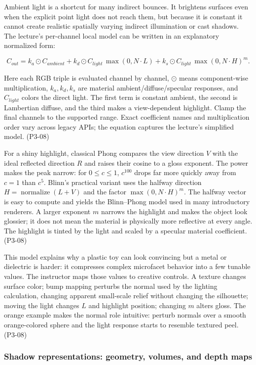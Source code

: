 Ambient light is a shortcut for many indirect bounces. It brightens surfaces even when the explicit point light does not reach them, but because it is constant it cannot create realistic spatially varying indirect illumination or cast shadows. The lecture's per-channel local model can be written in an explanatory normalized form:

\[
C_{out}=k_a\odot C_{ambient}+k_d\odot C_{light}\,\max(0,N\cdot L)+k_s\odot C_{light}\,\max(0,N\cdot H)^m.
\]

Here each RGB triple is evaluated channel by channel, \(\odot\) means component-wise multiplication, \(k_a,k_d,k_s\) are material ambient/diffuse/specular responses, and \(C_{light}\) colors the direct light. The first term is constant ambient, the second is Lambertian diffuse, and the third makes a view-dependent highlight. Clamp the final channels to the supported range. Exact coefficient names and multiplication order vary across legacy APIs; the equation captures the lecture's simplified model. (P3-08)

For a shiny highlight, classical Phong compares the view direction \(V\) with the ideal reflected direction \(R\) and raises their cosine to a gloss exponent. The power makes the peak narrow: for \(0\le c\le1\), \(c^{100}\) drops far more quickly away from \(c=1\) than \(c^5\). Blinn's practical variant uses the halfway direction \(H=\operatorname{normalize}(L+V)\) and the factor \(\max(0,N\cdot H)^m\). The halfway vector is easy to compute and yields the Blinn--Phong model used in many introductory renderers. A larger exponent \(m\) narrows the highlight and makes the object look glossier; it does not mean the material is physically more reflective at every angle. The highlight is tinted by the light and scaled by a specular material coefficient. (P3-08)

This model explains why a plastic toy can look convincing but a metal or dielectric is harder: it compresses complex microfacet behavior into a few tunable values. The instructor maps those values to creative controls. A texture changes surface color; bump mapping perturbs the normal used by the lighting calculation, changing apparent small-scale relief without changing the silhouette; moving the light changes \(L\) and highlight position; changing \(m\) alters gloss. The orange example makes the normal role intuitive: perturb normals over a smooth orange-colored sphere and the light response starts to resemble textured peel. (P3-08)

\subsubsection{Shadow representations: geometry, volumes, and depth maps}\label{03-visual-computing-i-ch011-shadow-representations-geometry-volumes-and-depth-maps}

